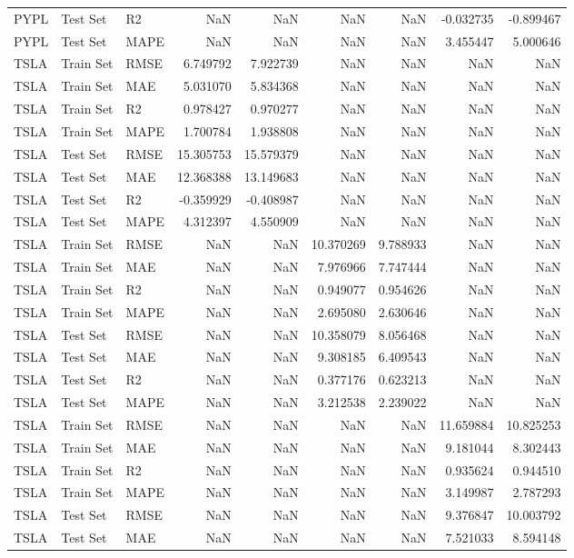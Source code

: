 \begin{tabular}{lllrrrrrr}
PYPL & Test Set & R2 & NaN & NaN & NaN & NaN & -0.032735 & -0.899467 \\
PYPL & Test Set & MAPE & NaN & NaN & NaN & NaN & 3.455447 & 5.000646 \\
TSLA & Train Set & RMSE & 6.749792 & 7.922739 & NaN & NaN & NaN & NaN \\
TSLA & Train Set & MAE & 5.031070 & 5.834368 & NaN & NaN & NaN & NaN \\
TSLA & Train Set & R2 & 0.978427 & 0.970277 & NaN & NaN & NaN & NaN \\
TSLA & Train Set & MAPE & 1.700784 & 1.938808 & NaN & NaN & NaN & NaN \\
TSLA & Test Set & RMSE & 15.305753 & 15.579379 & NaN & NaN & NaN & NaN \\
TSLA & Test Set & MAE & 12.368388 & 13.149683 & NaN & NaN & NaN & NaN \\
TSLA & Test Set & R2 & -0.359929 & -0.408987 & NaN & NaN & NaN & NaN \\
TSLA & Test Set & MAPE & 4.312397 & 4.550909 & NaN & NaN & NaN & NaN \\
TSLA & Train Set & RMSE & NaN & NaN & 10.370269 & 9.788933 & NaN & NaN \\
TSLA & Train Set & MAE & NaN & NaN & 7.976966 & 7.747444 & NaN & NaN \\
TSLA & Train Set & R2 & NaN & NaN & 0.949077 & 0.954626 & NaN & NaN \\
TSLA & Train Set & MAPE & NaN & NaN & 2.695080 & 2.630646 & NaN & NaN \\
TSLA & Test Set & RMSE & NaN & NaN & 10.358079 & 8.056468 & NaN & NaN \\
TSLA & Test Set & MAE & NaN & NaN & 9.308185 & 6.409543 & NaN & NaN \\
TSLA & Test Set & R2 & NaN & NaN & 0.377176 & 0.623213 & NaN & NaN \\
TSLA & Test Set & MAPE & NaN & NaN & 3.212538 & 2.239022 & NaN & NaN \\
TSLA & Train Set & RMSE & NaN & NaN & NaN & NaN & 11.659884 & 10.825253 \\
TSLA & Train Set & MAE & NaN & NaN & NaN & NaN & 9.181044 & 8.302443 \\
TSLA & Train Set & R2 & NaN & NaN & NaN & NaN & 0.935624 & 0.944510 \\
TSLA & Train Set & MAPE & NaN & NaN & NaN & NaN & 3.149987 & 2.787293 \\
TSLA & Test Set & RMSE & NaN & NaN & NaN & NaN & 9.376847 & 10.003792 \\
TSLA & Test Set & MAE & NaN & NaN & NaN & NaN & 7.521033 & 8.594148 \\

\end{tabular}
